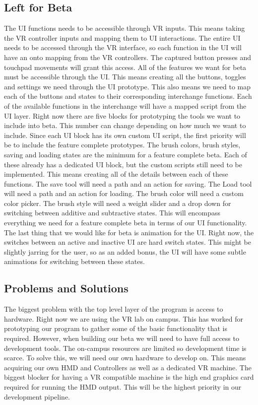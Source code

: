 \documentclass[onecolumn, draftclsnofoot,10pt, compsoc]{IEEEtran}
\begin{document}
\subsection{Left for Beta}
The UI functions needs to be accessible through VR inputs. This means taking the VR controller inputs and mapping them to UI interactions. The entire UI needs to be accessed through the VR interface, so each function in the UI will have an onto mapping from the VR controllers. The captured button presses and touchpad movements will grant this access. 
All of the features we want for beta must be accessible through the UI. This means creating all the buttons, toggles and settings we need through the UI prototype. This also means we need to map each of the buttons and states to their corresponding interchange functions. Each of the available functions in the interchange will have a mapped script from the UI layer. Right now there are five blocks for prototyping the tools we want to include into beta. This number can change depending on how much we want to include. Since each UI block has its own custom UI script, the first priority will be to include the feature complete prototypes. The brush colors, brush styles, saving and loading states are the minimum for a feature complete beta. Each of these already has a dedicated UI block, but the custom scripts still need to be implemented. This means creating all of the details between each of these functions. The save tool will need a path and an action for saving. The Load tool will need a path and an action for loading. The brush color will need a custom color picker. The brush style will need a weight slider and a drop down for switching between additive and subtractive states. This will encompass everything we need for a feature complete beta in terms of our UI functionality. 
The last thing that we would like for beta is animation for the UI. Right now, the switches between an active and inactive UI are hard switch states. This might be slightly jarring for the user, so as an added bonus, the UI will have some subtle animations for switching between these states. 

\subsection{Problems and Solutions}
The biggest problem with the top level layer of the program is access to hardware. Right now we are using the VR lab on campus. This has worked for prototyping our program to gather some of the basic functionality that is required. However, when building our beta we will need to have full access to development tools. The on-campus resources are limited so development time is scarce. To solve this, we will need our own hardware to develop on. This means acquiring our own HMD and Controllers as well as a dedicated VR machine. The biggest blocker for having a VR compatible machine is the high end graphics card required for running the HMD output. This will be the highest priority in our development pipeline. 
\end{document}
